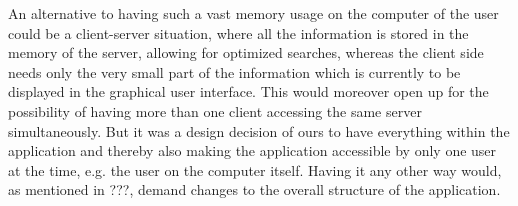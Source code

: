 An alternative to having such a vast memory usage on the computer of the user could be a client-server situation, where all the information is stored in the memory of the server, allowing for optimized searches, whereas the client side needs only the very small part of the information which is currently to be displayed in the graphical user interface. This would moreover open up for the possibility of having more than one client accessing the same server simultaneously. But it was a design decision of ours to have everything within the application and thereby also making the application accessible by only one user at the time, e.g. the user on the computer itself. Having it any other way would, as mentioned in ???, demand changes to the overall structure of the application.